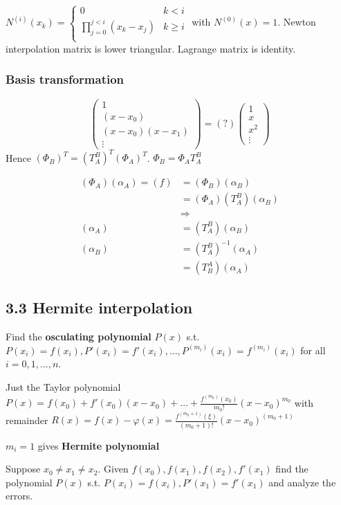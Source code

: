 \documentclass[11pt]{article}
\begin{document}
\(N^{(i)}(x_k)=\begin{cases}
    0&k<i\\
    \prod_{j=0}^{j<i}(x_k-x_j)&k\ge i\\
    \end{cases}\) with \(N^{(0)}(x) = 1\).
Newton interpolation matrix is lower triangular.
Lagrange matrix is identity.
\subsubsection{Basis transformation}
\label{sec:orgcb5da9d}
\begin{equation*}
\begin{pmatrix}
1\\
(x-x_0)\\
(x-x_0)(x-x_1)\\
\vdots
\end{pmatrix}=(?)
\begin{pmatrix}
1\\
x\\
x^2\\
\vdots
\end{pmatrix}
\end{equation*}
Hence \((\Phi_B)^T=(T_A^B)^T(\Phi_A)^T\).
\(\Phi_B=\Phi_AT_A^B\)

\begin{align*}
(\Phi_A)(\alpha_A)=(f)&=(\Phi_B)(\alpha_B)\\
&=(\Phi_A)(T_A^B)(\alpha_B)\\
&\Rightarrow\\
(\alpha_A)&=(T_A^B)(\alpha_B)\\
(\alpha_B)&=(T_A^B)^{-1}(\alpha_A)\\
&=(T_B^A)(\alpha_A)
\end{align*}
\subsection{3.3 Hermite interpolation}
\label{sec:orga54259a}
Find the \textbf{osculating polynomial} \(P(x)\) s.t. \(P(x_i)=f(x_i),
   P'(x_i)=f'(x_i),\dots,P^{(m_i)}(x_i)=f^{(m_i)}(x_i)\) for all \(i=0,1,\dots,n\).

Just the Taylor polynomial \(P(x)=f(x_0)+f'(x_0)(x-x_0)+\dots+
   \frac{f^{(m_0)}(x_0)}{m_0!}(x-x_0)^{m_0}\) with remainder 
\(R(x)=f(x)-\varphi(x)=\frac{f^{(m_0+1)}(\xi)}{(m_0+1)!}(x-x_0)^{(m_0+1)}\)

\(m_i = 1\) gives \textbf{Hermite polynomial}

\begin{example}
Suppose $x_0\neq x_1\neq x_2$. Given $f(x_0),f(x_1), f(x_2),
f'(x_1)$ find the polynomial $P(x)$ s.t. $P(x_i)=f(x_i),P'(x_1)=f'(x_1)$ and
analyze the errors.
\end{example}
\end{document}
